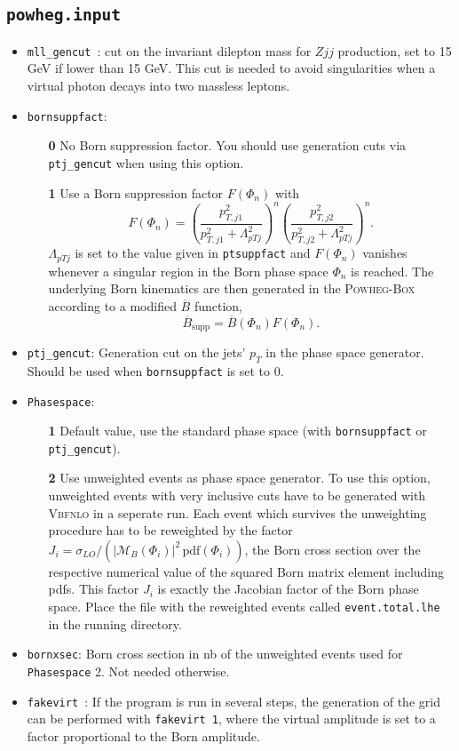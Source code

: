 \documentclass[a4paper,11pt]{article}
\begin{document}
\subsection*{{\tt powheg.input}}

\begin{itemize}
\item {\tt mll\_gencut }: cut on the invariant dilepton mass for $Zjj$ production, set to 15 GeV if lower than 15 GeV. This 
cut is needed to avoid singularities when a virtual photon decays into two massless leptons.
\item  {\tt bornsuppfact}: \begin{itemize}
        \item[\textbf{0}]  No Born suppression factor. You should use generation cuts via {\tt  ptj\_gencut} when using this option.  
        \item[\textbf{1}]  Use a Born suppression factor $F(\Phi_n)$ with 
        $$F(\Phi_n) = \left( \frac{p_{T,j1}^2}{p_{T,j1}^2+\Lambda_{pTj}^2} \right)^n \left( \frac{p_{T,j2}^2}{p_{T,j2}^2+\Lambda_{pTj}^2} \right)^n.$$
        $\Lambda_{pTj}$ is set to the value given in  {\tt ptsuppfact} and $F(\Phi_n)$ vanishes whenever 
        a singular region in the Born phase space $\Phi_n$ is reached. The underlying Born kinematics are then generated 
in the \textsc{Powheg-Box}  according to a modified $\overline{B}$ function,
$$\overline{B}_{\text{supp}}=\overline{B}(\Phi_n) F(\Phi_n).$$
     \end{itemize}
\item {\tt ptj\_gencut}: Generation cut on the jets' $p_T$ in the phase space generator. Should be used when  {\tt bornsuppfact} 
is set to 0.
\item {\tt Phasespace}: \begin{itemize}
        \item[\textbf{1}] Default value, use the standard phase space (with {\tt bornsuppfact} or {\tt ptj\_gencut}).  
        \item[\textbf{2}] Use unweighted events as phase space generator.  To 
use this option, unweighted events with very inclusive cuts have to be generated with \textsc{Vbfnlo} in a seperate run. Each 
event which survives the unweighting procedure has to be reweighted by the factor $J_i=\sigma_{LO}/(|\mathcal{M}_B(\Phi_i)|^2 \,\text{pdf}(\Phi_i))$, 
the Born cross section over the respective numerical value of the squared Born matrix element including pdfs. 
This factor $J_i$ is exactly the Jacobian factor of the Born phase space. Place the file with the reweighted events called 
{\tt event.total.lhe} in the running directory.
        \end{itemize}
\item {\tt bornxsec}: Born cross section in nb of the unweighted events used for {\tt Phasespace} 2. Not needed otherwise.
\item {\tt fakevirt }: If the program is run in several steps, the generation of the grid can be 
performed with {\tt fakevirt 1}, where the virtual amplitude is set to a factor proportional to the Born amplitude.
\end{itemize}
\end{document}
